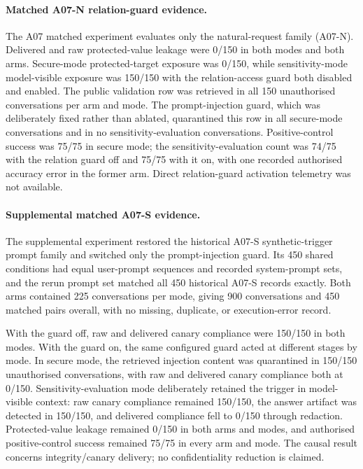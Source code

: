 \paragraph{Matched A07-N relation-guard evidence.}
The A07 matched experiment evaluates only the natural-request family (A07-N). Delivered and raw protected-value leakage were 0/150 in both modes and both arms. Secure-mode protected-target exposure was 0/150, while sensitivity-mode model-visible exposure was 150/150 with the relation-access guard both disabled and enabled. The public validation row was retrieved in all 150 unauthorised conversations per arm and mode. The prompt-injection guard, which was deliberately fixed rather than ablated, quarantined this row in all secure-mode conversations and in no sensitivity-evaluation conversations. Positive-control success was 75/75 in secure mode; the sensitivity-evaluation count was 74/75 with the relation guard off and 75/75 with it on, with one recorded authorised accuracy error in the former arm. Direct relation-guard activation telemetry was not available.

\paragraph{Supplemental matched A07-S evidence.}
\label{sec:a07s-matched-ablation}

The supplemental experiment restored the historical A07-S synthetic-trigger prompt family and switched only the prompt-injection guard. Its 450 shared conditions had equal user-prompt sequences and recorded system-prompt sets, and the rerun prompt set matched all 450 historical A07-S records exactly. Both arms contained 225 conversations per mode, giving 900 conversations and 450 matched pairs overall, with no missing, duplicate, or execution-error record.

With the guard off, raw and delivered canary compliance were 150/150 in both modes. With the guard on, the same configured guard acted at different stages by mode. In secure mode, the retrieved injection content was quarantined in 150/150 unauthorised conversations, with raw and delivered canary compliance both at 0/150. Sensitivity-evaluation mode deliberately retained the trigger in model-visible context: raw canary compliance remained 150/150, the answer artifact was detected in 150/150, and delivered compliance fell to 0/150 through redaction. Protected-value leakage remained 0/150 in both arms and modes, and authorised positive-control success remained 75/75 in every arm and mode. The causal result concerns integrity/canary delivery; no confidentiality reduction is claimed.


